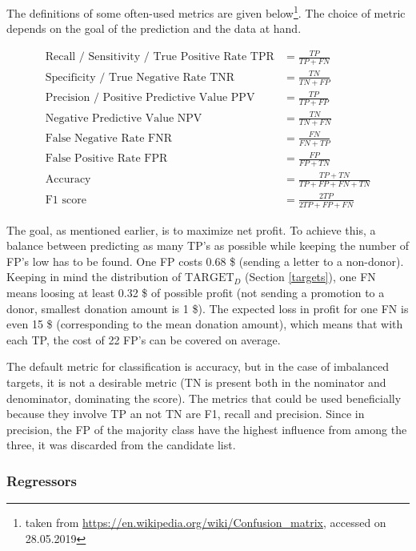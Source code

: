 \documentclass[
  11pt,
  a4paper,
  DIV=12,captions=tableheading,oneside,titlepage]{scrbook}
\begin{document}
The definitions of some often-used metrics are given below\footnote{taken from \url{https://en.wikipedia.org/wiki/Confusion_matrix}, accessed on 28.05.2019}. The choice of metric depends on the goal of the prediction and the data at hand.

\begin{align*}
\text{Recall / Sensitivity / True Positive Rate TPR} &= \frac{TP}{TP + FN} \\
\text{Specificity / True Negative Rate TNR} &= \frac{TN}{TN+FP} \\ 
\text{Precision / Positive Predictive Value PPV} &= \frac{TP}{TP + FP}\\
\text{Negative Predictive Value NPV} &= \frac{TN}{TN+FN}\\
\text{False Negative Rate FNR} &= \frac{FN}{FN+TP}\\
\text{False Positive Rate FPR} &= \frac{FP}{FP+TN}\\
\text{Accuracy} &= \frac{TP + TN}{TP + FP + FN + TN} \\
\text{F1 score} &= \frac{2TP}{2TP+FP+FN}
\end{align*}

The goal, as mentioned earlier, is to maximize net profit. To achieve this, a balance between predicting as many TP's as possible while keeping the number of FP's low has to be found. One FP costs 0.68 \$ (sending a letter to a non-donor). Keeping in mind the distribution of \(\text{TARGET}_D\) (Section \ref{targets}), one FN means loosing at least 0.32 \$ of possible profit (not sending a promotion to a donor, smallest donation amount is 1 \$). The expected loss in profit for one FN is even 15 \$ (corresponding to the mean donation amount), which means that with each TP, the cost of 22 FP's can be covered on average.

The default metric for classification is accuracy, but in the case of imbalanced targets, it is not a desirable metric (TN is present both in the nominator and denominator, dominating the score). The metrics that could be used beneficially because they involve TP an not TN are F1, recall and precision. Since in precision, the FP of the majority class have the highest influence from among the three, it was discarded from the candidate list.

\hypertarget{regressors}{%
\subsubsection{Regressors}\label{regressors}}
\end{document}

